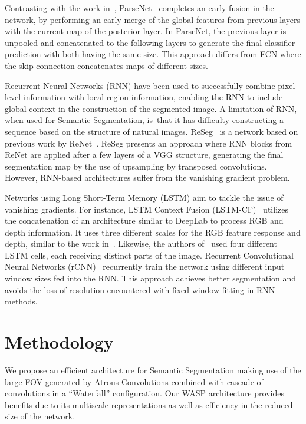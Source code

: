 \documentclass[sensors,article,accept,moreauthors,pdftex]{Definitions/mdpi}
\begin{document}
Contrasting with the work in~\cite{FCN}, ParseNet~\cite{Parsenet} completes an early fusion in the network, by performing an early merge of the global features from previous layers with the current map of the posterior layer. In ParseNet, the previous layer is unpooled and concatenated to the following layers to generate the final classifier prediction with both having the same size. This approach differs from FCN where the skip connection concatenates maps of different sizes.

Recurrent Neural Networks (RNN) have been used to successfully combine pixel-level information with local region information, enabling the RNN to include global context in the construction of the segmented image. A limitation of RNN, when used for Semantic Segmentation, is~that it has difficulty constructing a sequence based on the structure of natural images. ReSeg~\cite{ReSeg} is a network based on previous work by ReNet~\cite{ReNet}. ReSeg presents an approach where RNN blocks from ReNet are applied after a few layers of a VGG structure, generating the final segmentation map by the use of upsampling by transposed convolutions. However, RNN-based architectures suffer from the vanishing gradient problem.

Networks using Long Short-Term Memory (LSTM) aim to tackle the issue of vanishing gradients. For instance, LSTM Context Fusion (LSTM-CF)~\cite{LSTM-CF} utilizes the concatenation of an architecture similar to DeepLab to process RGB and depth information. It uses three different scales for the RGB feature response and depth, similar to the work in~\cite{DeepContrast}. Likewise, the authors of~\cite{2D-LSTM} used four different LSTM cells, each receiving distinct parts of the image. Recurrent Convolutional Neural Networks (rCNN)~\cite{recurCNN} recurrently train the network using different input window sizes fed into the RNN.
This approach achieves better segmentation and avoids the loss of resolution encountered with fixed window fitting in RNN methods.



\section{Methodology}

We propose an efficient architecture for Semantic Segmentation making use of the large FOV generated by Atrous Convolutions combined with cascade of convolutions in a ``Waterfall'' configuration. Our WASP architecture provides benefits due to its multiscale representations as well as efficiency in the reduced size of the network.
\end{document}
